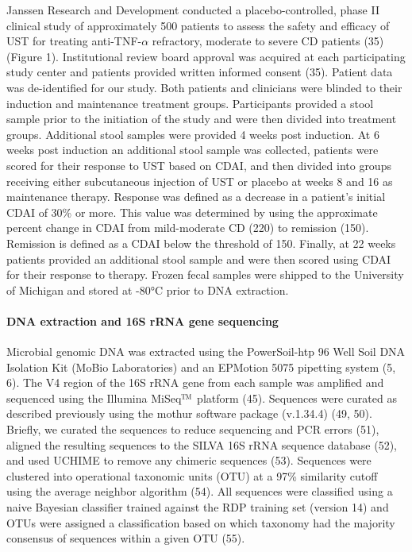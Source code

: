 \documentclass[12pt,]{article}
\let\oldparagraph\paragraph
\renewcommand{\paragraph}[1]{\oldparagraph{#1}\mbox{}}
\begin{document}
Janssen Research and Development conducted a placebo-controlled, phase
II clinical study of approximately 500 patients to assess the safety and
efficacy of UST for treating anti-TNF-\({\alpha}\) refractory, moderate
to severe CD patients (35) (Figure 1). Institutional review board
approval was acquired at each participating study center and patients
provided written informed consent (35). Patient data was de-identified
for our study. Both patients and clinicians were blinded to their
induction and maintenance treatment groups. Participants provided a
stool sample prior to the initiation of the study and were then divided
into treatment groups. Additional stool samples were provided 4 weeks
post induction. At 6 weeks post induction an additional stool sample was
collected, patients were scored for their response to UST based on CDAI,
and then divided into groups receiving either subcutaneous injection of
UST or placebo at weeks 8 and 16 as maintenance therapy. Response was
defined as a decrease in a patient's initial CDAI of 30\% or more. This
value was determined by using the approximate percent change in CDAI
from mild-moderate CD (220) to remission (150). Remission is defined as
a CDAI below the threshold of 150. Finally, at 22 weeks patients
provided an additional stool sample and were then scored using CDAI for
their response to therapy. Frozen fecal samples were shipped to the
University of Michigan and stored at -80°C prior to DNA extraction.

\paragraph{DNA extraction and 16S rRNA gene
sequencing}\label{dna-extraction-and-16s-rrna-gene-sequencing}

Microbial genomic DNA was extracted using the PowerSoil-htp 96 Well Soil
DNA Isolation Kit (MoBio Laboratories) and an EPMotion 5075 pipetting
system (5, 6). The V4 region of the 16S rRNA gene from each sample was
amplified and sequenced using the Illumina
MiSeq\(\text{\texttrademark}\) platform (45). Sequences were curated as
described previously using the mothur software package (v.1.34.4) (49,
50). Briefly, we curated the sequences to reduce sequencing and PCR
errors (51), aligned the resulting sequences to the SILVA 16S rRNA
sequence database (52), and used UCHIME to remove any chimeric sequences
(53). Sequences were clustered into operational taxonomic units (OTU) at
a 97\% similarity cutoff using the average neighbor algorithm (54). All
sequences were classified using a naive Bayesian classifier trained
against the RDP training set (version 14) and OTUs were assigned a
classification based on which taxonomy had the majority consensus of
sequences within a given OTU (55).
\end{document}
